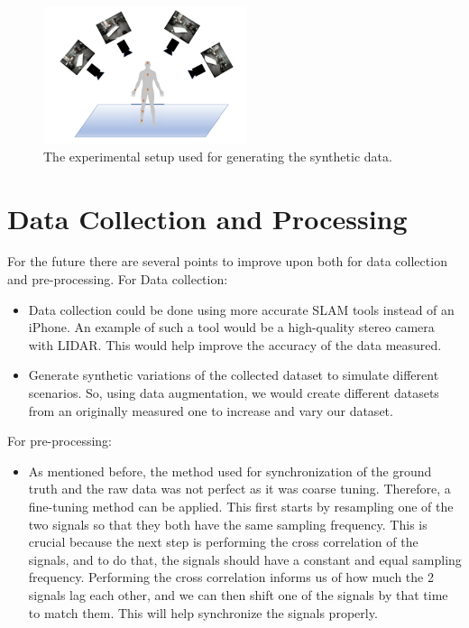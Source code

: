 \begin{figure}[h] 
	\centering \includegraphics[height=4cm]{./images/setupsynth.png}
	\caption{The experimental setup used for generating the synthetic data.}
	\label{setup_synthdata}
\end{figure}

\section{Data Collection and Processing}
For the future there are several points to improve upon both for data collection and pre-processing. 
For Data collection:

\begin{itemize}
  \item Data collection could be done using more accurate SLAM tools instead of an iPhone. An example of such a tool would be a high-quality stereo camera with LIDAR. This would help improve the accuracy of the data measured.
  \item Generate synthetic variations of the collected dataset to simulate different scenarios. So, using data augmentation, we would create different datasets from an originally measured one to increase and vary our dataset.
\end{itemize}

For pre-processing:

\begin{itemize}
  \item As mentioned before, the method used for synchronization of the ground truth and the raw data was not perfect as it was coarse tuning. Therefore, a fine-tuning method can be applied. This first starts by resampling one of the two signals so that they both have the same sampling frequency. This is crucial because the next step is performing the cross correlation of the signals, and to do that, the signals should have a constant and equal sampling frequency. Performing the cross correlation informs us of how much the 2 signals lag each other, and we can then shift one of the signals by that time to match them. This will help synchronize the signals properly. \cite{yan_2019_ronin}
\end{itemize}

